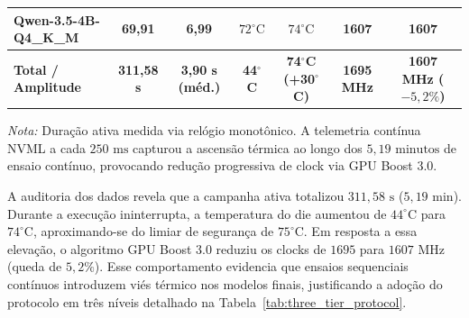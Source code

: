 \documentclass[10pt,a4paper,twocolumn]{article}
\begin{document}
\begin{table}[t]
\begin{tabularx}{\textwidth}{L{2.6cm} C C C C C C}
\textbf{Qwen-3.5-4B-Q4\_K\_M} & 69,91 & 6,99 & $72^\circ\text{C}$ & $74^\circ\text{C}$ & 1607 & 1607 \\
\midrule
\textbf{Total / Amplitude} & \textbf{311,58 s} & \textbf{3,90 s (m\'ed.)} & \textbf{44$^\circ$C} & \textbf{74$^\circ$C (+30$^\circ$C)} & \textbf{1695 MHz} & \textbf{1607 MHz ($-5,2\%$)} \\
\bottomrule
\end{tabularx}
\vspace{0.3em}
{\scriptsize \textit{Nota:} Dura\c{c}\~ao ativa medida via rel\'ogio monot\^onico. A telemetria cont\'inua NVML a cada $250\text{ ms}$ capturou a ascens\~ao t\'ermica ao longo dos $5,19\text{ minutos}$ de ensaio cont\'inuo, provocando redu\c{c}\~ao progressiva de clock via GPU Boost 3.0.}
\end{table}

A auditoria dos dados revela que a campanha ativa totalizou $311,58\text{ s}$ ($5,19\text{ min}$). Durante a execu\c{c}\~ao ininterrupta, a temperatura do die aumentou de $44^\circ\text{C}$ para $74^\circ\text{C}$, aproximando-se do limiar de seguran\c{c}a de $75^\circ\text{C}$. Em resposta a essa eleva\c{c}\~ao, o algoritmo GPU Boost 3.0 reduziu os clocks de $1695$ para $1607\text{ MHz}$ (queda de $5,2\%$). Esse comportamento evidencia que ensaios sequenciais cont\'inuos introduzem vi\'es t\'ermico nos modelos finais, justificando a ado\c{c}\~ao do protocolo em tr\^es n\'iveis detalhado na Tabela~\ref{tab:three_tier_protocol}.
\end{document}
